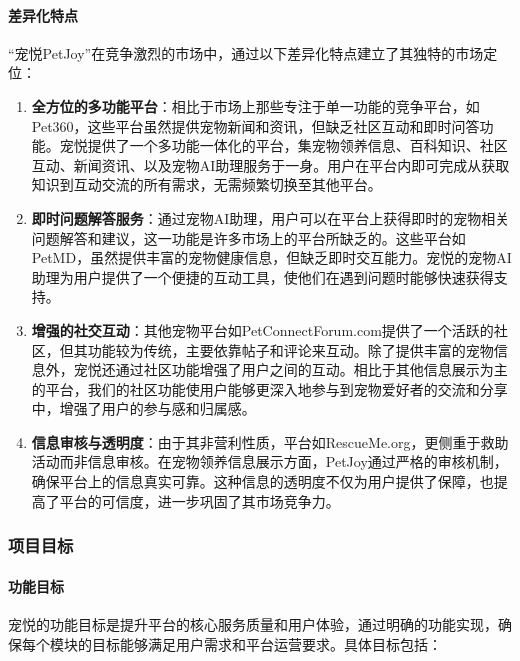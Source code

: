 \paragraph{差异化特点}

“宠悦PetJoy”在竞争激烈的市场中，通过以下差异化特点建立了其独特的市场定位：

\begin{enumerate}
    \item \textbf{全方位的多功能平台}：相比于市场上那些专注于单一功能的竞争平台，如Pet360，这些平台虽然提供宠物新闻和资讯，但缺乏社区互动和即时问答功能。宠悦提供了一个多功能一体化的平台，集宠物领养信息、百科知识、社区互动、新闻资讯、以及宠物AI助理服务于一身。用户在平台内即可完成从获取知识到互动交流的所有需求，无需频繁切换至其他平台。
    
    \item \textbf{即时问题解答服务}：通过宠物AI助理，用户可以在平台上获得即时的宠物相关问题解答和建议，这一功能是许多市场上的平台所缺乏的。这些平台如PetMD，虽然提供丰富的宠物健康信息，但缺乏即时交互能力。宠悦的宠物AI助理为用户提供了一个便捷的互动工具，使他们在遇到问题时能够快速获得支持。
    
    \item \textbf{增强的社交互动}：其他宠物平台如PetConnectForum.com提供了一个活跃的社区，但其功能较为传统，主要依靠帖子和评论来互动。除了提供丰富的宠物信息外，宠悦还通过社区功能增强了用户之间的互动。相比于其他信息展示为主的平台，我们的社区功能使用户能够更深入地参与到宠物爱好者的交流和分享中，增强了用户的参与感和归属感。
    
    \item \textbf{信息审核与透明度}：由于其非营利性质，平台如RescueMe.org，更侧重于救助活动而非信息审核。在宠物领养信息展示方面，PetJoy通过严格的审核机制，确保平台上的信息真实可靠。这种信息的透明度不仅为用户提供了保障，也提高了平台的可信度，进一步巩固了其市场竞争力。
\end{enumerate}

\subsubsection{项目目标}

\paragraph{功能目标}

宠悦的功能目标是提升平台的核心服务质量和用户体验，通过明确的功能实现，确保每个模块的目标能够满足用户需求和平台运营要求。具体目标包括：


